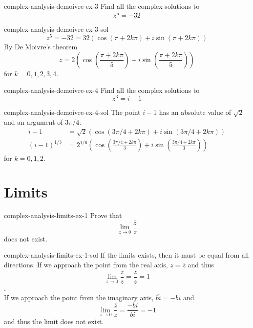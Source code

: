 \documentclass[preview]{standalone}
\begin{document}
\begin{snippetexercise}{complex-analysis-demoivre-ex-3}{} %
    Find all the complex solutions to
    \[ z^5 = -32 \]
\end{snippetexercise}

\begin{snippetsolution}{complex-analysis-demoivre-ex-3-sol}{}
    \[  z^5 = -32 = 32\left( \cos(\pi + 2k\pi) + i\sin(\pi + 2k\pi) \right) \]
    By De Moivre's theorem
    \[
        z = 2\left( 
            \cos\left(\frac{\pi + 2k\pi}{5}\right) + i\sin\left(\frac{\pi + 2k\pi}{5}\right)
        \right)
    \]
    for \(k=0,1,2,3,4\).
\end{snippetsolution}

\begin{snippetexercise}{complex-analysis-demoivre-ex-4}{} %
    Find all the complex solutions to
    \[ z^3 = i-1 \]
\end{snippetexercise}

\begin{snippetsolution}{complex-analysis-demoivre-ex-4-sol}{}
    The point \(i-1\) has an absolute value of \(\sqrt{2}\)
    and an argument of \(3\pi/4\).
    \begin{align*}
        i-1 &= \sqrt{2} \left(
            \cos(3\pi/4 +2k\pi) + i\sin(3\pi/4 +2k\pi)
        \right) \\
        (i-1)^{1/3} &= 2^{1/6}
        \left(
            \cos\left( \frac{3\pi/4 + 2k\pi}{3} \right)
            + i \sin\left( \frac{3\pi/4 + 2k\pi}{3} \right)
        \right)
    \end{align*}
    for \(k=0,1,2\).
\end{snippetsolution}

\section{Limits}

\begin{snippetexercise}{complex-analysis-limits-ex-1}{} %
    Prove that \[ \lim_{z \to 0} \dfrac{\overline{z}}{z} \]
    does not exist.
\end{snippetexercise}

\begin{snippetsolution}{complex-analysis-limits-ex-1-sol}{}
    If the limits exists, then it must be equal from all directions.
    If we approach the point from the real axis,
    \(z = \overline{z}\) and thus
    \[ \lim_{z \to 0} \dfrac{\overline{z}}{z} = \frac{z}{z} = 1 \]. \\
    If we approach the point from the imaginary axis,
    \( \overline{bi} = -bi \) and
    \[ \lim_{z \to 0} \dfrac{\overline{z}}{z} = \frac{-bi}{bi} = -1 \]
    and thus the limit does not exist.
\end{snippetsolution}
\end{document}

